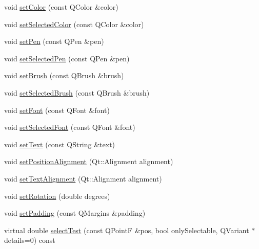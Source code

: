 \begin{DoxyCompactItemize}
\item 
void \hyperlink{class_q_c_p_item_text_aa51efc0841fe52da9eaf8aff6fc8a8b2}{set\+Color} (const Q\+Color \&color)
\item 
void \hyperlink{class_q_c_p_item_text_ae7ba0bdb75c897b028388e45bfd435fa}{set\+Selected\+Color} (const Q\+Color \&color)
\item 
void \hyperlink{class_q_c_p_item_text_a9b9ec6eea0eb0603977ff84d4c78d0a3}{set\+Pen} (const Q\+Pen \&pen)
\item 
void \hyperlink{class_q_c_p_item_text_a291febe586f0da3f1c392e77bef4aa20}{set\+Selected\+Pen} (const Q\+Pen \&pen)
\item 
void \hyperlink{class_q_c_p_item_text_a1c7e131516df2ed8d941ef31240ded8e}{set\+Brush} (const Q\+Brush \&brush)
\item 
void \hyperlink{class_q_c_p_item_text_a6b8377eeb2af75eb9528422671ac16cb}{set\+Selected\+Brush} (const Q\+Brush \&brush)
\item 
void \hyperlink{class_q_c_p_item_text_a94ad60ebe04f5c07c35e7c2029e96b1f}{set\+Font} (const Q\+Font \&font)
\item 
void \hyperlink{class_q_c_p_item_text_a0be2841772f83663c4db307928b82816}{set\+Selected\+Font} (const Q\+Font \&font)
\item 
void \hyperlink{class_q_c_p_item_text_a3dacdda0ac88f99a05b333b977c48747}{set\+Text} (const Q\+String \&text)
\item 
void \hyperlink{class_q_c_p_item_text_a781cdf8c640fc6a055dcff1e675c8c7a}{set\+Position\+Alignment} (Qt\+::\+Alignment alignment)
\item 
void \hyperlink{class_q_c_p_item_text_ab5bc0684c4d1bed81949a11b34dba478}{set\+Text\+Alignment} (Qt\+::\+Alignment alignment)
\item 
void \hyperlink{class_q_c_p_item_text_a4bcc10cd97952c3f749d75824b5077f0}{set\+Rotation} (double degrees)
\item 
void \hyperlink{class_q_c_p_item_text_aeea8a3e01f135f9dd0bb08f51db66310}{set\+Padding} (const Q\+Margins \&padding)
\item 
virtual double \hyperlink{class_q_c_p_item_text_a285b95bb6634c2e4f7768abb7a8bc69c}{select\+Test} (const Q\+PointF \&pos, bool only\+Selectable, Q\+Variant $\ast$details=0) const 
\end{DoxyCompactItemize}
